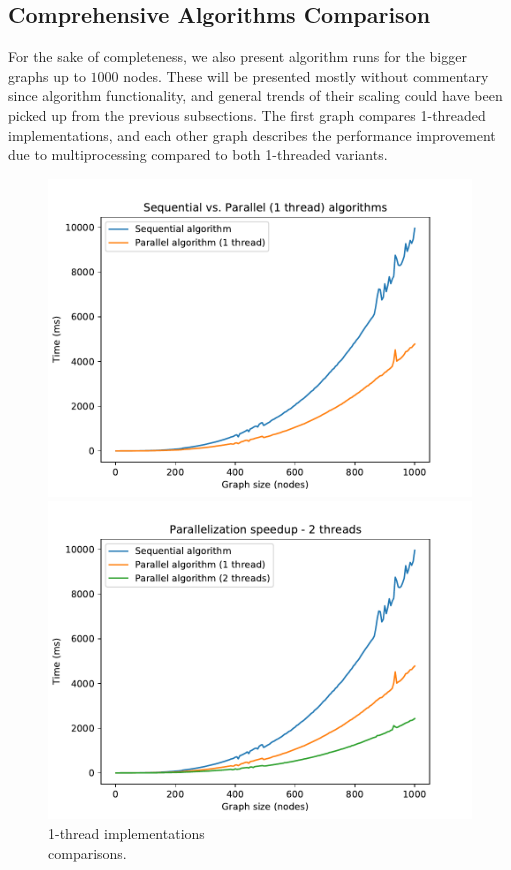 \documentclass[11pt,a4paper]{article}
\begin{document}
\subsection{Comprehensive Algorithms Comparison}
\label{ssec:comp_comprehensive}

For the sake of completeness, we also present algorithm runs for the bigger graphs up to $1000$ nodes. These will be presented mostly without commentary since algorithm functionality, and general trends of their scaling could have been picked up from the previous subsections. The first graph compares 1-threaded implementations, and each other graph describes the performance improvement due to multiprocessing compared to both 1-threaded variants.

\begin{figure}[H]
   \centering
   \begin{minipage}{.45\textwidth}
      \centering
      \includegraphics[width=\linewidth]{comp_1thread.pdf}
      \caption{1-thread implementations\\comparisons.}
      \label{fig:comp_1thread}
    \end{minipage}%
   \begin{minipage}{.45\textwidth}
      \centering
      \includegraphics[width=\linewidth]{comp_2thread.pdf}

\end{minipage}
\end{figure}
\end{document}
